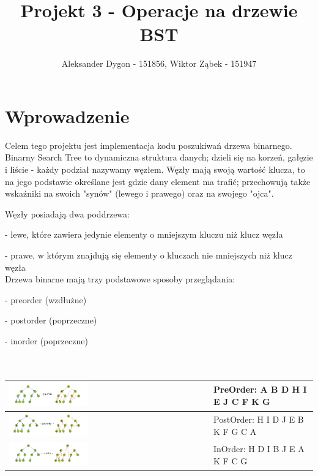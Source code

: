 \documentclass{article}
\title{Projekt 3 - Operacje na drzewie BST}
\author{Aleksander Dygon - 151856, Wiktor Ząbek - 151947}
\date{}
\begin{document}
\maketitle

\section*{Wprowadzenie}
Celem tego projektu jest implementacja kodu poszukiwań drzewa binarnego. Binarny Search Tree to dynamiczna struktura danych; dzieli się na korzeń, gałęzie i liście - każdy podział nazywamy węzłem. Węzły mają swoją wartość klucza, to na jego podstawie określane jest gdzie dany element ma trafić; przechowują także wskaźniki na swoich "synów" (lewego i prawego) oraz na swojego "ojca".

Węzły posiadają dwa poddrzewa:

- lewe, które zawiera jedynie elementy o mniejszym kluczu niż klucz węzła

- prawe, w którym znajdują się elementy o kluczach nie mniejszych  niż klucz węzła
\\
Drzewa binarne mają trzy podstawowe sposoby przeglądania: 

- preorder (wzdłużne)

- postorder (poprzeczne)

- inorder (poprzeczne) \\
\\
\\
\begin{table}[htbp]
\centering
\begin{tabular}{|>{\centering\arraybackslash}m{}|>{\centering\arraybackslash}m{}|}
\hline
\href{https://i.imgur.com/HIlcnIh.png}{\includegraphics[width=0.4\textwidth]{../assets/5_3.png}} & PreOrder: A B D H I E J C F K G \\
\hline
\href{https://i.imgur.com/ZXdwmZn.png}{\includegraphics[width=0.4\textwidth]{../assets/5_1.png}} & PostOrder: H I D J E B K F G C A \\
\hline
\href{https://i.imgur.com/zMCdQRN.png}{\includegraphics[width=0.4\textwidth]{../assets/5_2.png}} & InOrder: H D I B J E A K F C G \\
\hline
\end{tabular}
\end{table}
\end{document}
